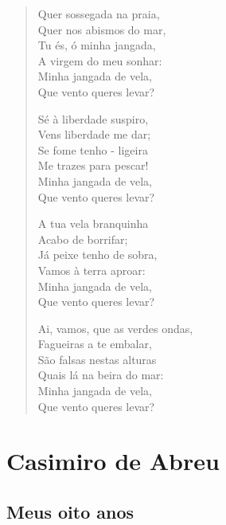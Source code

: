 \documentclass[10pt,a5paper,oneside]{book}
\begin{document}
\begin{verse}
Quer sossegada na praia,\\
Quer nos abismos do mar,\\
Tu és, ó minha jangada,\\
A virgem do meu sonhar:\\
Minha jangada de vela,\\
Que vento queres levar?

Sé à liberdade suspiro,\\
Vens liberdade me dar;\\
Se fome tenho - ligeira\\
Me trazes para pescar!\\
Minha jangada de vela,\\
Que vento queres levar?

A tua vela branquinha\\
Acabo de borrifar;\\
Já peixe tenho de sobra,\\
Vamos à terra aproar:\\
Minha jangada de vela,\\
Que vento queres levar?

Ai, vamos, que as verdes ondas,\\
Fagueiras a te embalar,\\
São falsas nestas alturas\\
Quais lá na beira do mar:\\
Minha jangada de vela,\\
Que vento queres levar?
\end{verse}

\part{Casimiro de Abreu}

\chapter{Meus oito anos}
\end{document}
